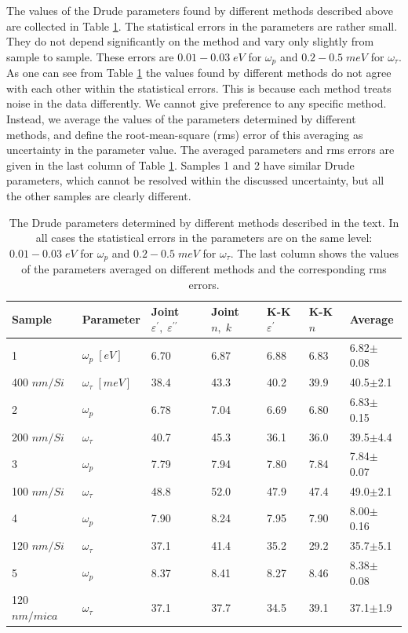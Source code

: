 \documentclass[prb]{revtex4}%
\begin{document}
\bigskip
The values of the Drude parameters found by different methods
described above are collected in Table \ref{tab2}. The statistical
errors in the parameters are rather small. They do not depend
significantly on the method and vary only slightly from sample to
sample. These errors are $0.01-0.03\; eV$ for $\omega_p$ and
$0.2-0.5\; meV$ for $\omega_{\tau}$. As one can see from Table
\ref{tab2} the values found by different methods do not agree with
each other within the statistical errors. This is because each
method treats noise in the data differently. We cannot give
preference to any specific method. Instead, we average the values of
the parameters determined by different methods, and define the
root-mean-square (rms) error of this averaging as uncertainty in the
parameter value. The averaged parameters and rms errors are given in
the last column of Table \ref{tab2}. Samples 1 and 2 have similar
Drude parameters, which cannot be resolved within the discussed
uncertainty, but all the other samples are clearly different.

\begin{table}
\centering
\begin{tabular}{l||l|l|l|l|l|l}
Sample & Parameter & Joint $\varepsilon^{\prime},\;\varepsilon^{\prime\prime}$ & Joint $n,\;k$ & K-K $\varepsilon^{\prime}$ & K-K $n$ & Average \\
\hline\hline 1 & $\omega_p\; [eV]$ & 6.70 & 6.87 & 6.88 & 6.83 & 6.82$\pm$0.08 \\
 400 $nm/Si$  & $\omega_{\tau}\; [meV]$ & 38.4 & 43.3 & 40.2 & 39.9 & 40.5$\pm$2.1\\
 \hline 2 & $\omega_p$ & 6.78 & 7.04 & 6.69 & 6.80 & 6.83$\pm$0.15 \\
 200 $nm/Si$ & $\omega_{\tau}$ & 40.7 & 45.3 & 36.1 & 36.0 & 39.5$\pm$4.4 \\
 \hline 3 & $\omega_p$ & 7.79 & 7.94 & 7.80 & 7.84 & 7.84$\pm$0.07 \\
 100 $nm/Si$ & $\omega_{\tau}$ & 48.8 & 52.0 & 47.9 & 47.4 & 49.0$\pm$2.1 \\
 \hline 4 & $\omega_p$ & 7.90 & 8.24 & 7.95 & 7.90 & 8.00$\pm$0.16 \\
 120 $nm/Si$ & $\omega_{\tau}$ & 37.1 & 41.4 & 35.2 & 29.2 & 35.7$\pm$5.1 \\
 \hline 5 & $\omega_p$ & 8.37 & 8.41 & 8.27 & 8.46 & 8.38$\pm$0.08 \\
 120 $nm/mica$ & $\omega_{\tau}$ & 37.1 & 37.7 & 34.5 & 39.1 &
 37.1$\pm$1.9
\end{tabular}
\caption{The Drude parameters determined by different methods
described in the text. In all cases the statistical errors in the
parameters are on the same level: $0.01-0.03\; eV$ for $\omega_p$
and $0.2-0.5\; meV$ for $\omega_{\tau}$. The last column shows the
values of the parameters averaged on different methods and the
corresponding rms errors.}\label{tab2}
\end{table}
\end{document}
